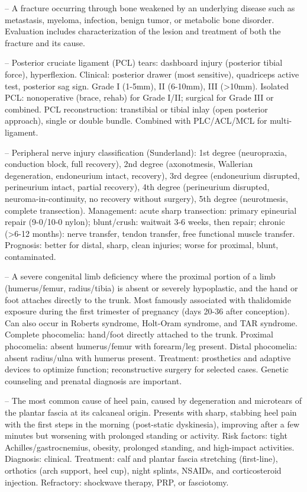 -- A fracture occurring through bone weakened by an underlying disease such as metastasis, myeloma, infection, benign tumor, or metabolic bone disorder. Evaluation includes characterization of the lesion and treatment of both the fracture and its cause.

-- Posterior cruciate ligament (PCL) tears: dashboard injury (posterior tibial force), hyperflexion. Clinical: posterior drawer (most sensitive), quadriceps active test, posterior sag sign. Grade I (1-5mm), II (6-10mm), III (>10mm). Isolated PCL: nonoperative (brace, rehab) for Grade I/II; surgical for Grade III or combined. PCL reconstruction: transtibial or tibial inlay (open posterior approach), single or double bundle. Combined with PLC/ACL/MCL for multi-ligament.

-- Peripheral nerve injury classification (Sunderland): 1st degree (neuropraxia, conduction block, full recovery), 2nd degree (axonotmesis, Wallerian degeneration, endoneurium intact, recovery), 3rd degree (endoneurium disrupted, perineurium intact, partial recovery), 4th degree (perineurium disrupted, neuroma-in-continuity, no recovery without surgery), 5th degree (neurotmesis, complete transection). Management: acute sharp transection: primary epineurial repair (9-0/10-0 nylon); blunt/crush: waitwait 3-6 weeks, then repair; chronic (>6-12 months): nerve transfer, tendon transfer, free functional muscle transfer. Prognosis: better for distal, sharp, clean injuries; worse for proximal, blunt, contaminated.

-- A severe congenital limb deficiency where the proximal portion of a limb (humerus/femur, radius/tibia) is absent or severely hypoplastic, and the hand or foot attaches directly to the trunk. Most famously associated with thalidomide exposure during the first trimester of pregnancy (days 20-36 after conception). Can also occur in Roberts syndrome, Holt-Oram syndrome, and TAR syndrome. Complete phocomelia: hand/foot directly attached to the trunk. Proximal phocomelia: absent humerus/femur with forearm/leg present. Distal phocomelia: absent radius/ulna with humerus present. Treatment: prosthetics and adaptive devices to optimize function; reconstructive surgery for selected cases. Genetic counseling and prenatal diagnosis are important.

-- The most common cause of heel pain, caused by degeneration and microtears of the plantar fascia at its calcaneal origin. Presents with sharp, stabbing heel pain with the first steps in the morning (post-static dyskinesia), improving after a few minutes but worsening with prolonged standing or activity. Risk factors: tight Achilles/gastrocnemius, obesity, prolonged standing, and high-impact activities. Diagnosis: clinical. Treatment: calf and plantar fascia stretching (first-line), orthotics (arch support, heel cup), night splints, NSAIDs, and corticosteroid injection. Refractory: shockwave therapy, PRP, or fasciotomy.

